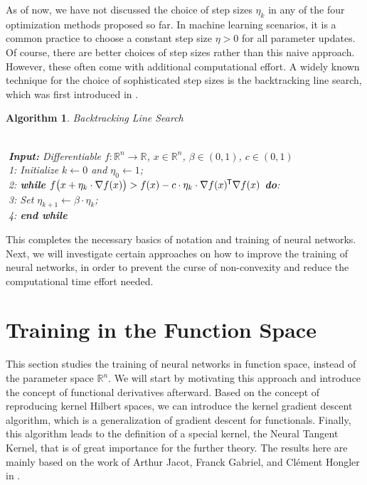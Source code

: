 \documentclass[11pt, a4paper]{article}
\newtheorem{algorithm}[theorem]{Algorithm}
\newcommand{\R}{\mathbb{R}}
\newcommand*{\tr}{^{\mkern-1.5mu\mathsf{T}}}
\begin{document}
As of now, we have not discussed the choice of step sizes $\eta_k$ in any of the four optimization methods proposed so far. In machine learning scenarios, it is a common practice to choose a constant step size $\eta > 0$ for all parameter updates. Of course, there are better choices of step sizes rather than this naive approach. However, these often come with additional computational effort. A widely known technique for the choice of sophisticated step sizes is the backtracking line search, which was first introduced in \cite{Armijo}. 
\begin{algorithm} 
\caption{Backtracking Line Search \textcolor{white}{$\Big |$}} \ \\
\textcolor{white}{$\Big |$}\textbf{Input:} Differentiable $f: \R^n \to \R$, $x \in \R^n$, $\beta \in (0,1)$, $c \in (0,1)$ \\ 
\textcolor{white}{$\Big |$}1: Initialize $k \leftarrow 0$ and $\eta_0 \leftarrow 1$; \\
\textcolor{white}{$\Big |$}2: \textbf{while} $f \big (x + \eta_k \cdot \nabla f(x) \big) > f(x) - c \cdot \eta_k \cdot \nabla f(x) \tr \nabla f(x)$ \textbf{do}: \\
\textcolor{white}{$\Big |$}3: \quad Set $\eta_{k+1} \leftarrow \beta \cdot \eta_k$; \\
\textcolor{white}{$\Big |$}4: \textbf{end while}
\end{algorithm}

This completes the necessary basics of notation and training of neural networks. Next, we will investigate certain approaches on how to improve the training of neural networks, in order to prevent the curse of non-convexity and reduce the computational  time effort needed. \\

\pagebreak
\section{Training in the Function Space} \label{sec:functionspace}

This section studies the training of neural networks in function space, instead of the parameter space $\R^n$. We will start by motivating this approach and introduce the concept of functional derivatives afterward. Based on the concept of reproducing kernel Hilbert spaces, we can introduce the kernel gradient descent algorithm, which is a generalization of gradient descent for functionals. Finally, this algorithm leads to the definition of a special kernel, the Neural Tangent Kernel, that is of great importance for the further theory. The results here are mainly based on the work of Arthur Jacot, Franck Gabriel, and Cl\'{e}ment Hongler in \cite{NTK}.
\end{document}
